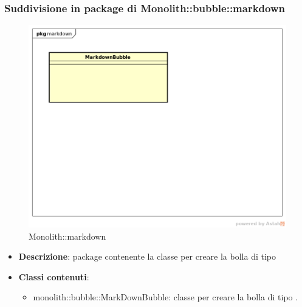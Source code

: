 \subsubsection{Suddivisione in package  di Monolith::bubble::markdown}
\label{Monolith::bubble::markdown}
\begin{figure}[H]
	\centering
	\includegraphics[scale=0.5]{Sezioni/imgPackage/bubble_markdown.png}
	\caption{Monolith::markdown}
\end{figure}
\begin{itemize}
	\item{\textbf{Descrizione}}: package contenente la classe per creare la bolla di tipo 
	\item{\textbf{Classi contenuti}}:
	\begin{itemize}
	\item{monolith::bubble::MarkDownBubble}: classe per creare la bolla di tipo .
	\end{itemize}
\end{itemize}

